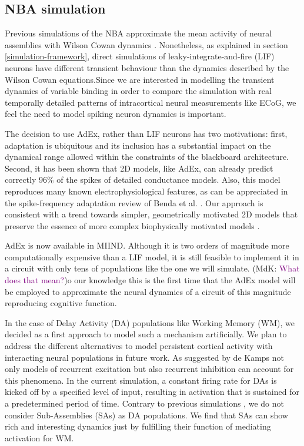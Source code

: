 \documentclass[10pt]{article}
\newcommand{\noteMdK}[2]{(MdK: \textcolor{purple}{#1})}
\begin{document}
\subsection{NBA simulation}\label{architectural-decisions}

Previous simulations of the NBA approximate the mean activity of neural assemblies with Wilson Cowan dynamics \cite{Frank_2014}.
Nonetheless, as explained in section \ref{simulation-framework}, direct simulations of leaky-integrate-and-fire (LIF) neurons \cite{omurtag2000simulation} have different transient behaviour than the dynamics described by the Wilson Cowan equations.Since we are interested in modelling the transient dynamics of variable binding in order to compare 
the simulation with real temporally detailed patterns of intracortical neural measurements like ECoG, we feel the need to model spiking neuron dynamics is important.

The decision to use AdEx, rather than LIF neurons has two motivations: first, adaptation is ubiquitous and its inclusion has a substantial impact on the dynamical range
allowed within the constraints of the blackboard architecture. Second,  it has been shown that 2D models, like AdEx, can already predict correctly 96\% of the spikes of 
detailed conductance models\cite{brette2005adaptive}.  Also, this model reproduces many known electrophysiological features, as can be appreciated in the spike-frequency adaptation review of Benda et al. \cite{Benda_2003,Benda_2014}. Our approach is consistent with a trend towards simpler, geometrically motivated  2D   models  that preserve the essence of more complex biophysically motivated models \cite{izhikevich}.


AdEx is now available in  MIIND. Although it is two orders of magnitude more computationally expensive than a LIF model, it is still feasible to implement 
it in a circuit with only tens of populations like the one we will simulate.
\noteMdK{What does that mean?}
To our knowledge this is the first time that the AdEx model will be employed to approximate the neural dynamics of a circuit of this magnitude reproducing cognitive function.

In the case of Delay Activity (DA) populations like Working Memory (WM), we decided as a first approach to model such a mechanism artificially.
We plan to address the different alternatives to model persistent cortical activity with interacting neural populations in future work.
As suggested by de Kamps\cite{de_Kamps_2005} not only models of recurrent excitation but also recurrent inhibition can account for this phenomena.
In the current simulation, a constant firing rate for DAs is kicked off by a specified level of input, resulting in activation  that is sustained for a predetermined period of time.
Contrary to previous simulations \cite{velde2015ambiguity}, we do not consider Sub-Assemblies (SAs) as DA populations.
We find that SAs can show rich and interesting dynamics just by fulfilling their function of mediating activation for WM.
\end{document}
